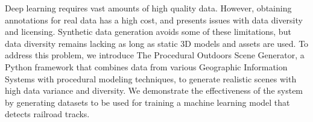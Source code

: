 
Deep learning requires vast amounts of high quality data. However, obtaining annotations for real data has a high cost, and presents issues with data diversity and licensing. Synthetic data generation avoids some of these limitations, but data diversity remains lacking as long as static 3D models and assets are used. To address this problem, we introduce The Procedural Outdoors Scene Generator, a Python framework that combines data from various Geographic Information Systems with procedural modeling techniques, to generate realistic scenes with high data variance and diversity. We demonstrate the effectiveness of the system by generating datasets to be used for training a machine learning model that detects railroad tracks.
